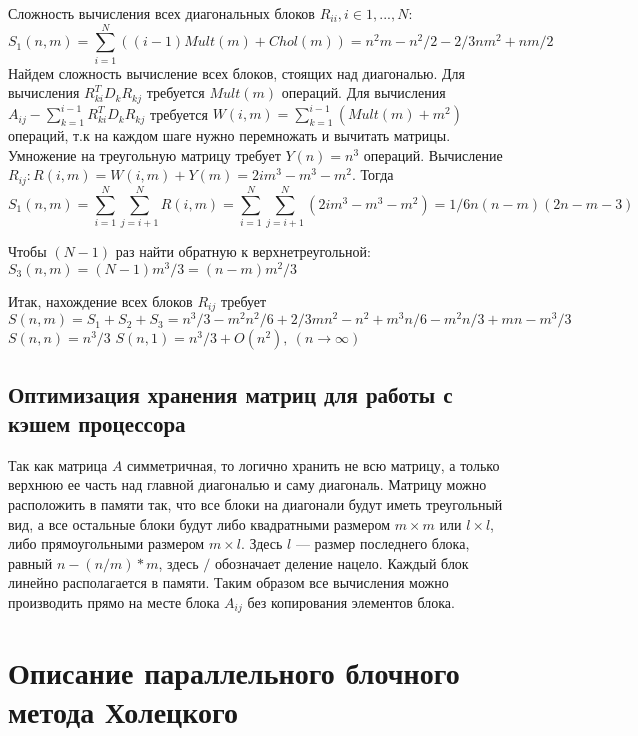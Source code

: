 \documentclass[a4paper, 12pt]{article}
\begin{document}
Сложность вычисления всех диагональных 
блоков $R_{ii}, i \in {1,...,N}$:
$$ S_1(n,m) = 
\sum_{i=1}^N ((i-1)Mult(m)+Chol(m))
= n^2m-n^2/2-2/3nm^2+nm/2$$
Найдем сложность вычисление всех блоков, стоящих над диагональю.
Для вычисления $R_{ki}^TD_kR_{kj}$ требуется $Mult(m)$ операций.
Для вычисления $A_{ij} - \sum_{k=1}^{i-1}R_{ki}^TD_kR_{kj}$ 
требуется $W(i,m)=\sum_{k=1}^{i-1}(Mult(m)+m^2)$ операций, т.к на 
каждом шаге нужно перемножать и вычитать матрицы.
Умножение на треугольную матрицу требует
$Y(n)=n^3$ операций.
Вычисление $R_{ij}: R(i, m) = W(i,m)+Y(m)=2im^3-m^3-m^2$.
Тогда $$S_1(n, m)=\sum_{i=1}^N\sum_{j=i+1}^N R(i,m) = 
\sum_{i=1}^N\sum_{j=i+1}^N (2im^3-m^3-m^2)=
1/6n(n-m)(2n-m-3)$$

Чтобы $(N-1)$ раз найти обратную к верхнетреугольной:
$S_3(n, m) = (N-1)m^3/3 = (n-m)m^2/3$

Итак, нахождение всех блоков $R_{ij}$ требует
$$S(n, m)= S_1 + S_2+S_3 = n^3/3-m^2n^2/6+2/3mn^2-n^2+m^3n/6-m^2n/3
+mn-m^3/3$$
\newline
$S(n,n)=n^3/3$
\newline
$S(n,1)=n^3/3+O(n^2),\ (n \to \infty )$

\subsection{Оптимизация хранения матриц для работы с кэшем процессора}
Так как матрица $A$ симметричная, то логично хранить не всю
матрицу, а только верхнюю ее часть над главной диагональю 
и саму диагональ. Матрицу можно расположить в памяти так, что
все блоки на диагонали будут иметь треугольный вид, а все 
остальные блоки будут либо квадратными размером
$m \times m$ или $l \times l$, либо прямоугольными размером
$m \times l$. Здесь $l$ --- размер последнего блока, равный
$n-(n/m)*m$, здесь $/$ обозначает деление нацело. Каждый блок 
линейно располагается в памяти. 
Таким образом все вычисления можно производить прямо на месте
блока $A_{ij}$ без копирования элементов блока. 


\section{Описание параллельного блочного метода Холецкого}
\end{document}
